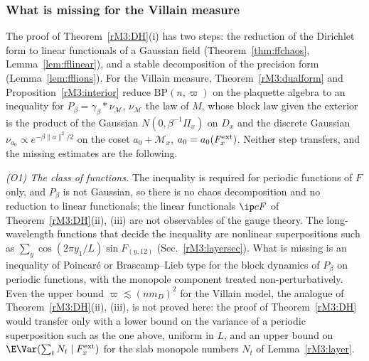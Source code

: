 \subsubsection{What is missing for the Villain measure}\label{rM3:missing}

The proof of Theorem~\ref{rM3:DH}(i) has two steps: the reduction of the
Dirichlet form to linear functionals of a Gaussian field
(Theorem~\ref{thm:ffchaos}, Lemma~\ref{lem:fflinear}), and a stable
decomposition of the precision form (Lemma~\ref{lem:fflions}). For the
Villain measure, Theorem~\ref{rM3:dualform} and
Proposition~\ref{rM3:interior} reduce $\mathrm{BP}(n,\varpi)$ on the
plaquette algebra to an inequality for $P_\beta=\gamma_\beta*\nu_{\mathcal M}$,
$\nu_{\mathcal M}$ the law of $M$, whose block law given the exterior is
the product of the Gaussian $N(0,\beta^{-1}\Pi_x)$ on $D_x$ and the
discrete Gaussian $\nu_{a_0}\propto e^{-\beta\lVert a\rVert^2/2}$ on the coset
$a_0+\mathcal M_x$, $a_0=a_0(F^{\rm ext}_x)$. Neither step transfers, and
the missing estimates are the following.

\emph{(O1) The class of functions.} The inequality is required for
periodic functions of $F$ only, and $P_\beta$ is not Gaussian, so there is
no chaos decomposition and no reduction to linear functionals; the linear
functionals $\ip cF$ of Theorem~\ref{rM3:DH}(ii), (iii) are not
observables of the gauge theory. The long-wavelength functions that decide the inequality
are nonlinear superpositions such as $\sum_y\cos(2\pi y_1/L)\sin F_{(y,12)}$
(Sec.~\ref{rM3:layersec}). What is missing is an inequality of Poincar\'e
or Brascamp--Lieb type for the block dynamics of $P_\beta$ on periodic
functions, with the monopole component treated non-perturbatively. Even
the upper bound $\varpi\lesssim(nm_D)^2$ for the Villain model, the
analogue of Theorem~\ref{rM3:DH}(ii), (iii), is not proved here: the
proof of Theorem~\ref{rM3:DH} would transfer only with a lower bound on
the variance of a periodic superposition such as the one above, uniform
in $L$, and an upper bound on $\E\Var(\sum_tN_t\mid F^{\rm ext}_x)$ for the
slab monopole numbers $N_t$ of Lemma~\ref{rM3:layer}.

